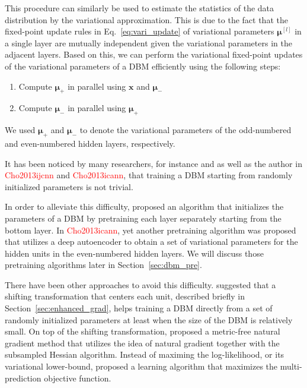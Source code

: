 \documentclass{now}
\newcommand{\qlay}[1]{\left[#1\right]}
\newcommand{\vect}[1]{\mathbf{#1}}
\newcommand{\vects}[1]{\boldsymbol{#1}}
\newcommand{\vx}[0]{\vect{x}}
\newcommand{\vmu}[0]{\vects{\mu}}
\newcommand{\alert}[1]{\textcolor{red}{#1}}
\newcommand{\citepub}[1]{\alert{#1}}
\begin{document}
This procedure can similarly be used to estimate the
statistics of the data distribution by the variational
approximation. This is due to the fact that the fixed-point
update rules in Eq.~\eqref{eq:vari_update} of variational
parameters $\vmu^{\qlay{l}}$ in a single layer are mutually
independent given the variational parameters in the adjacent
layers. Based on this, we can perform the variational
fixed-point updates of the variational parameters of a DBM
efficiently using the following steps:
\begin{enumerate}
    \itemsep 0em
    \item Compute $\vmu_+$ in parallel using $\vx$ and $\vmu_-$
    \item Compute $\vmu_-$ in parallel using $\vmu_+$
\end{enumerate}
We used $\vmu_+$ and $\vmu_-$ to denote the variational
parameters of the odd-numbered and even-numbered hidden
layers, respectively.

It has been noticed by many researchers, for instance
\citet{Salakhutdinov2009a} and \citet{Desjardins2012} as
well as the author in \citepub{Cho2013ijcnn} and
\citepub{Cho2013icann}, that training
a DBM starting from randomly initialized parameters is not
trivial. 

In order to alleviate this difficulty,
\citet{Salakhutdinov2009a,Salakhutdinov2012} proposed an
algorithm that initializes the parameters of a DBM by
pretraining each layer separately starting from the bottom
layer. In \citepub{Cho2013icann}, yet another pretraining
algorithm was proposed that utilizes a deep autoencoder to
obtain a set of variational parameters for the hidden units
in the even-numbered hidden layers.  We will discuss those
pretraining algorithms later in Section~\ref{sec:dbm_pre}.

There have been other approaches to avoid this difficulty.
\citet{Montavon2012} suggested that a shifting
transformation that centers each unit, described briefly in
Section~\ref{sec:enhanced_grad}, helps training a DBM
directly from a set of randomly initialized parameters at
least when the size of the DBM is relatively small.  On top
of the shifting transformation, \citet{Desjardins2013}
proposed a metric-free natural gradient method that utilizes
the idea of natural gradient together with the subsampled
Hessian algorithm. Instead of maximing the log-likelihood,
or its variational lower-bound, \citep{Goodfellow2013a}
proposed a learning algorithm that maximizes the
multi-prediction objective function.
\end{document}

